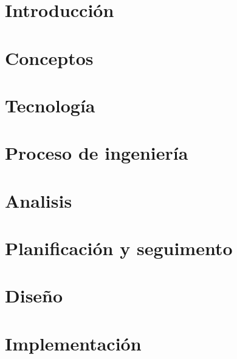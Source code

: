 \documentclass[11pt,a4paper,titlepage,twoside,openright]{report}
\begin{document}
\makeatletter
\def\cleardoublepage{\clearpage\if@twoside \ifodd\c@page\else
  \hbox{}\thispagestyle{empty}\newpage\if@twocolumn\hbox{}\newpage\fi\fi\fi}
\makeatother

\tableofcontents


\chapter{Introducción}
        \label{intro}
        
        \cleardoublepage

\chapter{Conceptos}
        \label{concept}
        
        \cleardoublepage

\chapter{Tecnología}
        \label{tec}
        
        \cleardoublepage

\chapter{Proceso de ingeniería}
		\label{ing}
		
		\cleardoublepage

\chapter{Analisis}
		
		\cleardoublepage


\chapter{Planificación y seguimento}




\chapter{Diseño}
		
 		


\chapter{Implementación}
		
\end{document}
